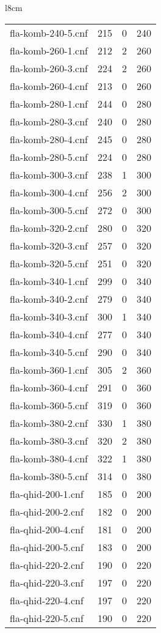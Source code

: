 \begin{wraptable}{l}{8cm}
\begin{tabular}{l| c c c }
fla-komb-240-5.cnf & 215 & 0 & 240 \\
fla-komb-260-1.cnf & 212 & 2 & 260 \\
fla-komb-260-3.cnf & 224 & 2 & 260 \\
fla-komb-260-4.cnf & 213 & 0 & 260 \\
fla-komb-280-1.cnf & 244 & 0 & 280 \\
fla-komb-280-3.cnf & 240 & 0 & 280 \\
fla-komb-280-4.cnf & 245 & 0 & 280 \\
fla-komb-280-5.cnf & 224 & 0 & 280 \\
fla-komb-300-3.cnf & 238 & 1 & 300 \\
fla-komb-300-4.cnf & 256 & 2 & 300 \\
fla-komb-300-5.cnf & 272 & 0 & 300 \\
fla-komb-320-2.cnf & 280 & 0 & 320 \\
fla-komb-320-3.cnf & 257 & 0 & 320 \\
fla-komb-320-5.cnf & 251 & 0 & 320 \\
fla-komb-340-1.cnf & 299 & 0 & 340 \\
fla-komb-340-2.cnf & 279 & 0 & 340 \\
fla-komb-340-3.cnf & 300 & 1 & 340 \\
fla-komb-340-4.cnf & 277 & 0 & 340 \\
fla-komb-340-5.cnf & 290 & 0 & 340 \\
fla-komb-360-1.cnf & 305 & 2 & 360 \\
fla-komb-360-4.cnf & 291 & 0 & 360 \\
fla-komb-360-5.cnf & 319 & 0 & 360 \\
fla-komb-380-2.cnf & 330 & 1 & 380 \\
fla-komb-380-3.cnf & 320 & 2 & 380 \\
fla-komb-380-4.cnf & 322 & 1 & 380 \\
fla-komb-380-5.cnf & 314 & 0 & 380 \\
fla-qhid-200-1.cnf & 185 & 0 & 200 \\
fla-qhid-200-2.cnf & 182 & 0 & 200 \\
fla-qhid-200-4.cnf & 181 & 0 & 200 \\
fla-qhid-200-5.cnf & 183 & 0 & 200 \\
fla-qhid-220-2.cnf & 190 & 0 & 220 \\
fla-qhid-220-3.cnf & 197 & 0 & 220 \\
fla-qhid-220-4.cnf & 197 & 0 & 220 \\
fla-qhid-220-5.cnf & 190 & 0 & 220 \\

\end{tabular}
\end{wraptable}
